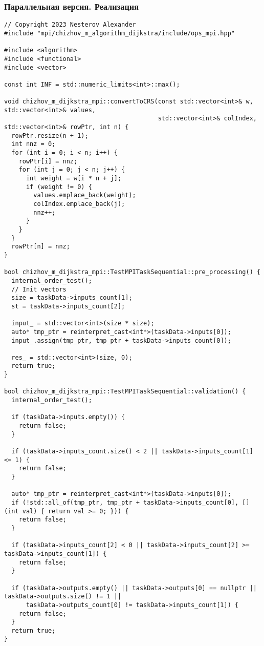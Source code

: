 \documentclass[a4paper, 14pt]{extarticle}
\begin{document}
\subsubsection{Параллельная версия. Реализация}
\begin{lstlisting}
// Copyright 2023 Nesterov Alexander
#include "mpi/chizhov_m_algorithm_dijkstra/include/ops_mpi.hpp"

#include <algorithm>
#include <functional>
#include <vector>

const int INF = std::numeric_limits<int>::max();

void chizhov_m_dijkstra_mpi::convertToCRS(const std::vector<int>& w, std::vector<int>& values,
                                          std::vector<int>& colIndex, std::vector<int>& rowPtr, int n) {
  rowPtr.resize(n + 1);
  int nnz = 0;
  for (int i = 0; i < n; i++) {
    rowPtr[i] = nnz;
    for (int j = 0; j < n; j++) {
      int weight = w[i * n + j];
      if (weight != 0) {
        values.emplace_back(weight);
        colIndex.emplace_back(j);
        nnz++;
      }
    }
  }
  rowPtr[n] = nnz;
}

bool chizhov_m_dijkstra_mpi::TestMPITaskSequential::pre_processing() {
  internal_order_test();
  // Init vectors
  size = taskData->inputs_count[1];
  st = taskData->inputs_count[2];

  input_ = std::vector<int>(size * size);
  auto* tmp_ptr = reinterpret_cast<int*>(taskData->inputs[0]);
  input_.assign(tmp_ptr, tmp_ptr + taskData->inputs_count[0]);

  res_ = std::vector<int>(size, 0);
  return true;
}

bool chizhov_m_dijkstra_mpi::TestMPITaskSequential::validation() {
  internal_order_test();

  if (taskData->inputs.empty()) {
    return false;
  }

  if (taskData->inputs_count.size() < 2 || taskData->inputs_count[1] <= 1) {
    return false;
  }

  auto* tmp_ptr = reinterpret_cast<int*>(taskData->inputs[0]);
  if (!std::all_of(tmp_ptr, tmp_ptr + taskData->inputs_count[0], [](int val) { return val >= 0; })) {
    return false;
  }

  if (taskData->inputs_count[2] < 0 || taskData->inputs_count[2] >= taskData->inputs_count[1]) {
    return false;
  }

  if (taskData->outputs.empty() || taskData->outputs[0] == nullptr || taskData->outputs.size() != 1 ||
      taskData->outputs_count[0] != taskData->inputs_count[1]) {
    return false;
  }
  return true;
}


\end{lstlisting}
\end{document}
